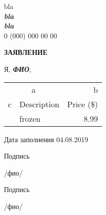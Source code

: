 \documentclass[12pt, a4paper]{article}
\begin{document}
\begin{flushright}
bla\\
\textit{\textbf{
bla\\
bla}}\\
0 (000) 000 00 00
\end{flushright}

\begin{center}
	\textbf{ЗАЯВЛЕНИЕ}
\end{center}

Я, \textit{\textbf{ФИО}}, 

\begin{table}[h!]
\begin{tabular}{|l|l|r|}
\hline
\multicolumn{2}{|c|}{a} & b \\ \cline{1-3}
c        & Description & Price (\$) \\ \hline
 		 & frozen      & 8.99       \\ \hline
\end{tabular}
\end{table}

Дата заполнения 04.08.2019

Подпись 

\begin{flushright}
	\underline{\hskip 100pt} /фио/
\end{flushright}

Подпись 

\begin{flushright}
	\vskip 20pt
	\underline{\hskip 100pt} /фио/
\end{flushright}
\end{document}
